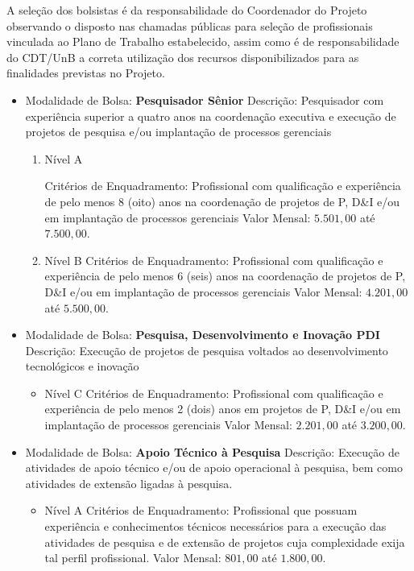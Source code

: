 A seleção dos bolsistas é da responsabilidade do Coordenador do Projeto observando o disposto nas chamadas públicas para seleção de profissionais 
vinculada ao Plano de Trabalho estabelecido, assim como é de responsabilidade do CDT/UnB a correta utilização dos recursos disponibilizados para
as finalidades previstas no Projeto.
 
\begin{itemize}
 \item Modalidade de Bolsa: \textbf{Pesquisador Sênior}
  Descrição: Pesquisador com experiência superior a quatro anos na coordenação executiva e execução de projetos de pesquisa e/ou implantação
  de processos gerenciais
  \begin{enumerate}
   \item   Nível A
   
Critérios de Enquadramento: Profissional com qualificação e experiência de pelo menos 8 (oito) anos na coordenação de projetos de P, 
D\&I e/ou em implantação de processos gerenciais
Valor Mensal: $5.501,00$ até $7.500,00$.
  \item  Nível B
Critérios de Enquadramento: Profissional com qualificação e experiência de pelo menos 6 (seis) anos na coordenação de projetos de P,
D\&I e/ou em implantação de processos gerenciais
Valor Mensal: $4.201,00$ até $5.500,00$.
  \end{enumerate}

   \item Modalidade de Bolsa: \textbf{Pesquisa, Desenvolvimento e Inovação PDI}
Descrição: Execução de projetos de pesquisa voltados ao desenvolvimento tecnológicos e inovação
  \begin{itemize}
   \item  Nível C
Critérios de Enquadramento: Profissional com qualificação e experiência de pelo menos 2 (dois) anos em projetos de P, D\&I e/ou em implantação
de processos gerenciais
Valor Mensal: $2.201,00$ até $3.200,00$.
  \end{itemize}
  \item Modalidade de Bolsa: \textbf{Apoio Técnico à Pesquisa}
Descrição: Execução de atividades de apoio técnico e/ou de apoio operacional à pesquisa, bem como atividades de extensão ligadas à pesquisa.
  \begin{itemize}
   \item  Nível A
Critérios de Enquadramento: Profissional que possuam experiência e conhecimentos técnicos necessários para a execução das atividades de pesquisa e de extensão de projetos cuja complexidade exija tal perfil profissional.
Valor Mensal: $801,00$ até $1.800,00$.
  \end{itemize}

\end{itemize}
  
